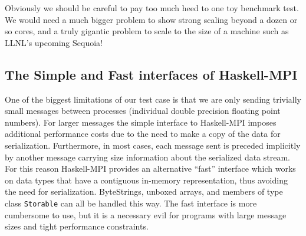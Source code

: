 \documentclass{tmr}
\begin{document}
Obviously we should be careful to pay too much heed to one toy benchmark test.
We would need a much bigger problem to show strong scaling beyond a dozen or so cores,
and a truly gigantic problem to scale to the size of a machine such as LLNL's
upcoming Sequoia!

\subsection{The Simple and Fast interfaces of Haskell-MPI}

One of the biggest limitations of our test case is that we are only sending trivially
small messages between processes (individual double precision floating point numbers).
For larger messages the simple interface to Haskell-MPI imposes additional
performance costs due to the need to make a copy of the data for serialization.
Furthermore, in most cases, each message sent is preceded implicitly by another
message carrying size information about the serialized data stream.
For this reason Haskell-MPI provides an alternative ``fast'' interface which works
on data types that have a contiguous in-memory representation, thus avoiding
the need for serialization. ByteStrings, unboxed arrays, and members of type class
\verb|Storable| can all be handled this way. The fast interface is more
cumbersome to use, but it is a necessary evil for programs with large message sizes
and tight performance constraints.

\end{document}
